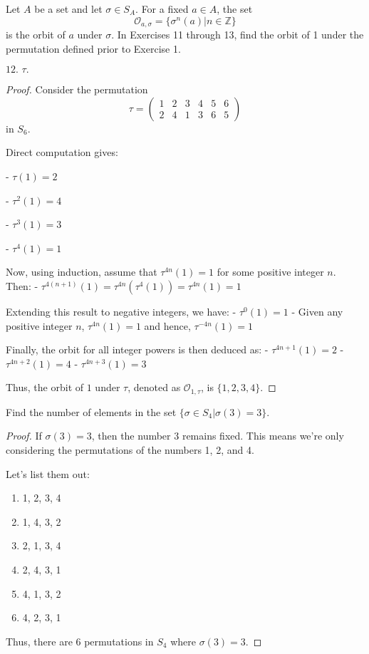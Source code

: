\documentclass[12pt]{amsart}
\theoremstyle{definition}
\numberwithin{equation}{section}
\theoremstyle{plain}
\newcommand{\Z}{\mathbb{Z}}
\begin{document}
\begin{exercise}{12} Let $A$ be a set and let $\sigma \in S_A$. For a fixed $a \in A$, the set
    \[\mathcal{O}_{a,\sigma} = \{\sigma^n(a) | n \in \Z\}\]
    is the orbit of $a$ under $\sigma$. In Exercises 11 through 13, find the orbit of 1 under the permutation defined prior to
    Exercise 1.

    \(\text{12. }\tau.\)
    \begin{proof}
    Consider the permutation
    \[\tau = 
    \begin{pmatrix}
    1 & 2 & 3 & 4 & 5 & 6 \\
    2 & 4 & 1 & 3 & 6 & 5
    \end{pmatrix} 
    \]
    in \(S_6\).

    Direct computation gives:
    
   - \(\tau(1) = 2\)

   - \(\tau^2(1) = 4\)

   - \(\tau^3(1) = 3\)

   - \(\tau^4(1) = 1\)

    Now, using induction, assume that \(\tau^{4n}(1) = 1\) for some positive integer \(n\). Then:
   - \(\tau^{4(n+1)}(1) = \tau^{4n}(\tau^4(1)) = \tau^{4n}(1) = 1\)
    
    Extending this result to negative integers, we have:
   - \(\tau^0(1) = 1\)
   - Given any positive integer \(n\), \(\tau^{4n}(1) = 1\) and hence, \(\tau^{-4n}(1) = 1\)

    Finally, the orbit for all integer powers is then deduced as:
   - \(\tau^{4n+1}(1) = 2\)
   - \(\tau^{4n+2}(1) = 4\)
   - \(\tau^{4n+3}(1) = 3\)

    Thus, the orbit of \(1\) under \(\tau\), denoted as \(\mathcal{O}_{1,\tau}\), is \(\{1, 2, 3, 4\}\).
    \end{proof}
\end{exercise}
\vspace*{20pt}
\begin{exercise}{16} Find the number of elements in the set \(\{\sigma \in S_4 | \sigma(3) = 3\}\).
    \begin{proof}
        If \(\sigma(3) = 3\), then the number 3 remains fixed. This means we're only considering the permutations of the numbers 1, 2, and 4.
        
        Let's list them out:
        \begin{enumerate}
            \item 1, 2, 3, 4
            \item 1, 4, 3, 2
            \item 2, 1, 3, 4
            \item 2, 4, 3, 1
            \item 4, 1, 3, 2
            \item 4, 2, 3, 1
        \end{enumerate}
        
        Thus, there are 6 permutations in \(S_4\) where \(\sigma(3) = 3\).
        \end{proof}
\end{exercise}
\end{document}
